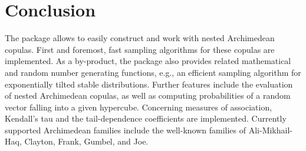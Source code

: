 \documentclass[nojss,article]{jss}
\theoremstyle{mythmstyle}
\begin{document}
\section{Conclusion}
The package  allows to easily construct and work with nested
Archimedean copulas. First and foremost, fast sampling algorithms for these copulas
are implemented. As a by-product, the package also provides related mathematical
and random number generating functions, e.g., an efficient
sampling algorithm for exponentially tilted stable distributions. Further
features include the evaluation of nested Archimedean copulas, as well as
computing probabilities of a random vector falling into a given hypercube.
Concerning measures of association, Kendall's tau and the tail-dependence
coefficients are implemented. Currently supported Archimedean families include
the well-known families of Ali-Mikhail-Haq, Clayton, Frank, Gumbel, and Joe.


\end{document}
